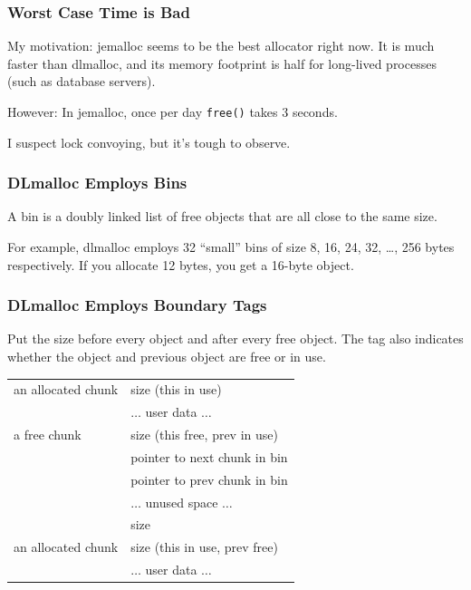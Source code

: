 \documentclass[xcolor=dvipsnames,14pt]{beamer}
\begin{document}
\begin{frame}
\frametitle{Worst Case Time is Bad}

My motivation: jemalloc seems to be the best allocator right now.  It
is much faster than dlmalloc, and its memory footprint is half for
long-lived processes (such as database servers).

\vfill
However: In jemalloc, once per day \texttt{free()} takes 3 seconds.

\vfill
I suspect lock convoying, but it's tough to observe.
\end{frame}

\begin{frame}
\frametitle{DLmalloc Employs Bins}
A bin is a doubly linked list of free objects that are all close to the same size.

\vfill

For example, dlmalloc employs 32 ``small'' bins of size 8, 16, 24, 32,
\ldots, 256 bytes respectively.  If you allocate 12 bytes, you get a 16-byte object.

\end{frame}

\begin{frame}
\frametitle{DLmalloc Employs Boundary Tags}

Put the size before every object and after every free object.  The
tag also indicates whether the object and previous object are free or in use.

\begin{center}
\begin{tabular}{l|l|}
                                                    \hline
an allocated chunk & size (this in use)                \\ \cline{2-2}
                   & $\ldots$ user data $\ldots$ \\ \hline
a free chunk       & size (this free, prev in use)     \\ \cline{2-2}
                   & pointer to next chunk in bin \\ \cline{2-2}
                   & pointer to prev chunk in bin \\ \cline{2-2}
                   & $\ldots$ unused space $\ldots$ \\ \cline{2-2}
                   & size                        \\ \hline
an allocated chunk & size (this in use, prev free)    \\ \cline{2-2}
                   & $\ldots$ user data $\ldots$ \\ \hline
\end{tabular}
\end{center}
\end{frame}
\end{document}
